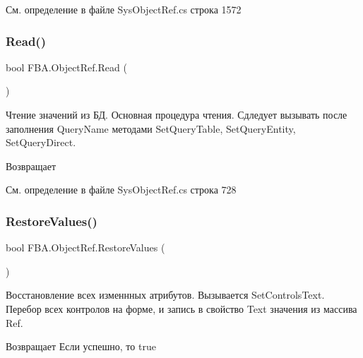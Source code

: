 См. определение в файле Sys\+Object\+Ref.\+cs строка 1572

\mbox{\label{class_f_b_a_1_1_object_ref_a58332d6e16861b5db182d3ceb58bbe02}} 
\subsubsection{\texorpdfstring{Read()}{Read()}}
{\footnotesize\ttfamily bool F\+B\+A.\+Object\+Ref.\+Read (\begin{DoxyParamCaption}{ }\end{DoxyParamCaption})}



Чтение значений из БД. Основная процедура чтения. Сдледует вызывать после заполнения Query\+Name методами Set\+Query\+Table, Set\+Query\+Entity, Set\+Query\+Direct. 

\begin{DoxyReturn}{Возвращает}

\end{DoxyReturn}


См. определение в файле Sys\+Object\+Ref.\+cs строка 728

\mbox{\label{class_f_b_a_1_1_object_ref_afbcae956ef25b55b2f27be15cd48922d}} 
\subsubsection{\texorpdfstring{Restore\+Values()}{RestoreValues()}}
{\footnotesize\ttfamily bool F\+B\+A.\+Object\+Ref.\+Restore\+Values (\begin{DoxyParamCaption}{ }\end{DoxyParamCaption})}



Восстановление всех изменнных атрибутов. Вызывается Set\+Controls\+Text. Перебор всех контролов на форме, и запись в свойство Text значения из массива Ref. ~\newline


\begin{DoxyReturn}{Возвращает}
Если успешно, то true
\end{DoxyReturn}



